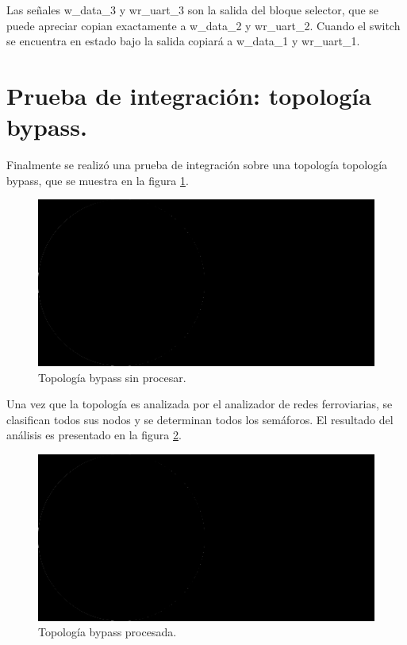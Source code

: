 	\vspace{5cm}
			
	Las señales w\_data\_3 y wr\_uart\_3 son la salida del bloque selector, que se puede apreciar copian exactamente a w\_data\_2 y wr\_uart\_2. Cuando el switch se encuentra en estado bajo la salida copiará a w\_data\_1 y wr\_uart\_1.
	
\section{Prueba de integración: topología bypass.}

	Finalmente se realizó una prueba de integración sobre una topología topología bypass, que se muestra en la figura \ref{fig:Bypass_1}.

	\begin{figure}[h]
	\centering
	\includegraphics[scale=0.5]{./Figures/XXX}
		\caption{Topología bypass sin procesar.}
		\label{fig:Bypass_1}
	\end{figure}
	
	Una vez que la topología es analizada por el analizador de redes ferroviarias, se clasifican todos sus nodos y se determinan todos los semáforos. El resultado del análisis es presentado en la figura \ref{fig:Bypass_2}.

	\begin{figure}[h]
	\centering
	\includegraphics[scale=0.5]{./Figures/XXX}
		\caption{Topología bypass procesada.}
		\label{fig:Bypass_2}
	\end{figure}
	
